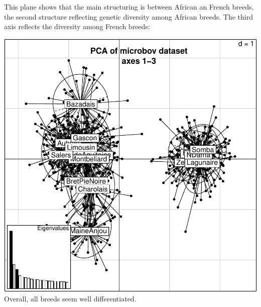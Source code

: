 \documentclass{article}
\begin{document}
\noindent This plane shows that the main structuring is between African an French breeds, the second structure reflecting genetic diversity among African breeds.
The third axis reflects the diversity among French breeds:
\begin{Schunk}
\end{Schunk}
\includegraphics{figs/base-072}
Overall, all breeds seem well differentiated.
~\\
\end{document}
